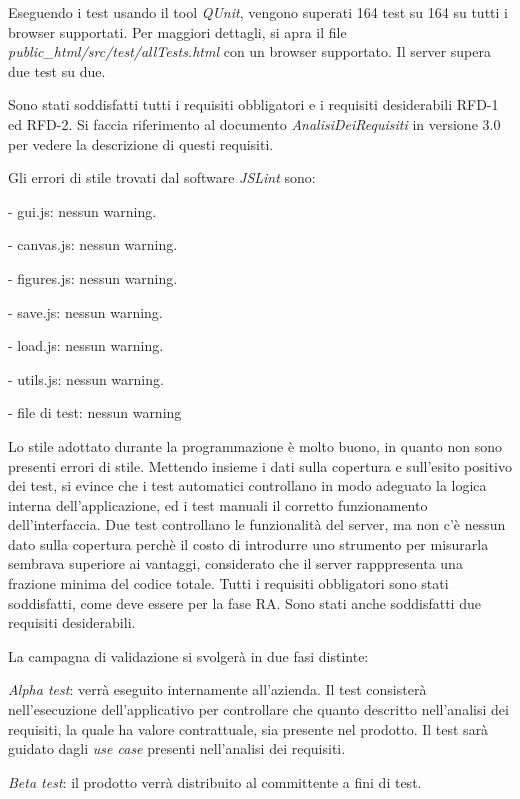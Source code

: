 Eseguendo i test usando il tool \textit{QUnit}, vengono superati 164 test su 164 su tutti i browser supportati. Per maggiori dettagli, si apra il file \textit{public{\_}html/src/test/allTests.html} con un browser supportato. Il server supera due test su due.

Sono stati soddisfatti tutti i requisiti obbligatori e i requisiti desiderabili RFD-1 ed RFD-2. Si faccia riferimento al documento \textit{AnalisiDeiRequisiti} in versione 3.0 per vedere la descrizione di questi requisiti.

Gli errori di stile trovati dal software \textit{JSLint} sono:
\begin{elencopuntato}[\subsubsecindent]
\item[-] gui.js: nessun warning.
\item[-] canvas.js: nessun warning.
\item[-] figures.js: nessun warning.
\item[-] save.js: nessun warning.
\item[-] load.js: nessun warning.
\item[-] utils.js: nessun warning.
\item[-] file di test: nessun warning
\end{elencopuntato}

 Lo stile adottato durante la programmazione \`e molto buono, in quanto non sono presenti errori di stile. Mettendo insieme i dati sulla copertura e sull'esito positivo dei test, si evince che i test automatici controllano in modo adeguato la logica interna dell'applicazione, ed i test manuali il corretto funzionamento dell'interfaccia. Due test controllano le funzionalit\`a del server, ma non c'\`e nessun dato sulla copertura perch\`e il costo di introdurre uno strumento per misurarla sembrava superiore ai vantaggi, considerato che il server rapppresenta una frazione minima del codice totale. Tutti i requisiti obbligatori sono stati soddisfatti, come deve essere per la fase RA. Sono stati anche soddisfatti due requisiti desiderabili.

 
 
 
La campagna di validazione si svolger\`a in due fasi distinte:
\begin{elenconumerato}[\textbf{}]{\subsubsecindent}
\item \textit{Alpha test}: verr\`a eseguito internamente all'azienda. Il test consister\`a nell'esecuzione dell'applicativo per controllare che quanto descritto nell'analisi dei requisiti, la quale ha valore contrattuale, sia presente nel prodotto. Il test sar\`a guidato dagli \textit{use case} presenti nell'analisi dei requisiti.
\item \textit{Beta test}: il prodotto verr\`a distribuito al committente a fini di test.
\end{elenconumerato}
 

 
